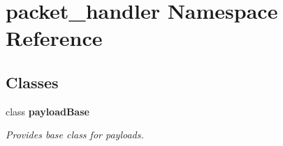 \section{packet\-\_\-handler \-Namespace \-Reference}
\label{namespacepacket__handler}
\subsection*{\-Classes}
\begin{DoxyCompactItemize}
\item 
class {\bf payload\-Base}
\begin{DoxyCompactList}\small\item\em \-Provides base class for payloads. \end{DoxyCompactList}\end{DoxyCompactItemize}
